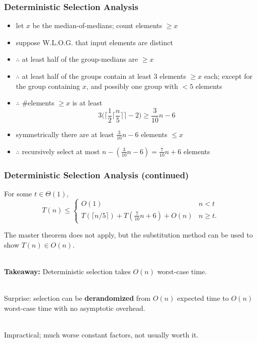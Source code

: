 \documentclass{beamer}
\newcommand{\stanza}{ \\~\ }
\begin{document}
\begin{frame} \frametitle{Deterministic Selection Analysis}
\begin{itemize}
  \item let $x$ be the median-of-medians; count elements $\geq x$
  \item suppose W.L.O.G. that input elements are distinct
  \item $\therefore$ at least half of the group-medians are $\geq x$
  \item $\therefore$ at least half of the groups contain at least 3 elements $\geq x$ each;
    except for the group containing $x$, and possibly one group with $<5$ elements
  \item $\therefore$ \#elements $\geq x$ is at least
  \[ 3 \Big( \Big\lceil \frac{1}{2} \lceil \frac{n}{5} \rceil \Big\rceil -2 \Big)
     \geq \frac{3}{10}n - 6 \]
  \item symmetrically there are at least $\frac{3}{10}n-6$ elements $\leq x$
  \item $\therefore$ recursively select at most $n-(\frac{3}{10}n-6)=\frac{7}{10}n+6$ elements
\end{itemize}
\end{frame}

\begin{frame} \frametitle{Deterministic Selection Analysis (continued)}
For some $t \in \Theta(1),$
  \[ T(n) \leq
      \begin{cases}
        O(1) & n < t \\
        T(\lceil n/5 \rceil) + T(\frac{7}{10}n+6) + O(n) & n \geq t .
      \end{cases}
  \]

The master theorem does not apply, but the substitution method can be used to
show $T(n) \in O(n).$ \stanza

\textbf{Takeaway:} Deterministic selection takes $O(n)$ worst-case time. \stanza

Surprise: selection can be \textbf{derandomized}
from $O(n)$ expected time to $O(n)$ worst-case time with no asymptotic overhead. \stanza

Impractical; much worse constant factors, not usually worth it.
\end{frame}
\end{document}
